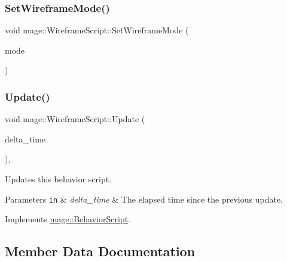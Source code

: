 \subsubsection{\texorpdfstring{Set\+Wireframe\+Mode()}{SetWireframeMode()}}
{\footnotesize\ttfamily void mage\+::\+Wireframe\+Script\+::\+Set\+Wireframe\+Mode (\begin{DoxyParamCaption}\item[{\hyperlink{classmage_1_1_wireframe_script_a99d65e77e89c2581544e68030adcefb7}{Wireframe\+Mode}}]{mode }\end{DoxyParamCaption})}

\hypertarget{classmage_1_1_wireframe_script_af077736607ad22f66d8553066af51760}{}\label{classmage_1_1_wireframe_script_af077736607ad22f66d8553066af51760} 
\subsubsection{\texorpdfstring{Update()}{Update()}}
{\footnotesize\ttfamily void mage\+::\+Wireframe\+Script\+::\+Update (\begin{DoxyParamCaption}\item[{double}]{delta\+\_\+time }\end{DoxyParamCaption})\hspace{0.3cm}{\ttfamily [override]}, {\ttfamily [virtual]}}

Updates this behavior script.


\begin{DoxyParams}[1]{Parameters}
\mbox{\tt in}  & {\em delta\+\_\+time} & The elapsed time since the previous update. \\
\hline
\end{DoxyParams}


Implements \hyperlink{classmage_1_1_behavior_script_a905b6c83640cb91d19fecab3435f6feb}{mage\+::\+Behavior\+Script}.



\subsection{Member Data Documentation}
\hypertarget{classmage_1_1_wireframe_script_a93de9a9a8bac873b63e7529df3327ef1}{}\label{classmage_1_1_wireframe_script_a93de9a9a8bac873b63e7529df3327ef1} 
